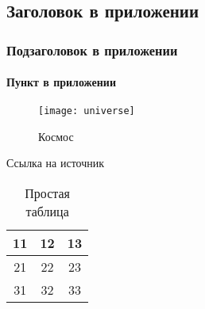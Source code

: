 \section{}\label{app:_section}

\subsection{Заголовок в приложении}\label{app:_subsection}

\subsubsection{Подзаголовок в приложении}\label{app:_subsubsection}

\paragraph{Пункт в приложении}\label{app:_paragraph}

\begin{figure}[H]
    \texttt{[image: universe]}
    \caption{Космос}\label{fig:app_fig}
\end{figure}

Ссылка на источник

\begin{table}[H]
\caption{Простая таблица}\label{tab:app_tab}
\begin{tabular}{|c|c|c|}
    \hline
    11 & 12 & 13\\\hline
    21 & 22 & 23\\\hline
    31 & 32 & 33\\\hline
\end{tabular}
\end{table}
